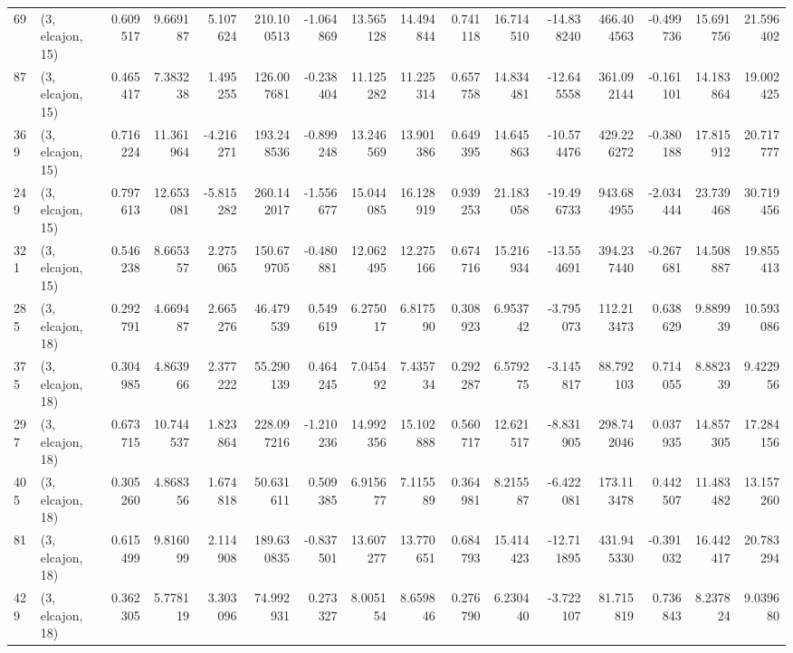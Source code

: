 \begin{tabular}{llrrrrrrrrrrrrrr}
69  &  (3, elcajon, 15) &   0.609517 &   9.669187 &   5.107624 &   210.100513 &  -1.064869 &  13.565128 &  14.494844 &  0.741118 &  16.714510 & -14.838240 &   466.404563 &  -0.499736 &  15.691756 &  21.596402 \\
87  &  (3, elcajon, 15) &   0.465417 &   7.383238 &   1.495255 &   126.007681 &  -0.238404 &  11.125282 &  11.225314 &  0.657758 &  14.834481 & -12.645558 &   361.092144 &  -0.161101 &  14.183864 &  19.002425 \\
369 &  (3, elcajon, 15) &   0.716224 &  11.361964 &  -4.216271 &   193.248536 &  -0.899248 &  13.246569 &  13.901386 &  0.649395 &  14.645863 & -10.574476 &   429.226272 &  -0.380188 &  17.815912 &  20.717777 \\
249 &  (3, elcajon, 15) &   0.797613 &  12.653081 &  -5.815282 &   260.142017 &  -1.556677 &  15.044085 &  16.128919 &  0.939253 &  21.183058 & -19.496733 &   943.684955 &  -2.034444 &  23.739468 &  30.719456 \\
321 &  (3, elcajon, 15) &   0.546238 &   8.665357 &   2.275065 &   150.679705 &  -0.480881 &  12.062495 &  12.275166 &  0.674716 &  15.216934 & -13.554691 &   394.237440 &  -0.267681 &  14.508887 &  19.855413 \\
285 &  (3, elcajon, 18) &   0.292791 &   4.669487 &   2.665276 &    46.479539 &   0.549619 &   6.275017 &   6.817590 &  0.308923 &   6.953742 &  -3.795073 &   112.213473 &   0.638629 &   9.889939 &  10.593086 \\
375 &  (3, elcajon, 18) &   0.304985 &   4.863966 &   2.377222 &    55.290139 &   0.464245 &   7.045492 &   7.435734 &  0.292287 &   6.579275 &  -3.145817 &    88.792103 &   0.714055 &   8.882339 &   9.422956 \\
297 &  (3, elcajon, 18) &   0.673715 &  10.744537 &   1.823864 &   228.097216 &  -1.210236 &  14.992356 &  15.102888 &  0.560717 &  12.621517 &  -8.831905 &   298.742046 &   0.037935 &  14.857305 &  17.284156 \\
405 &  (3, elcajon, 18) &   0.305260 &   4.868356 &   1.674818 &    50.631611 &   0.509385 &   6.915677 &   7.115589 &  0.364981 &   8.215587 &  -6.422081 &   173.113478 &   0.442507 &  11.483482 &  13.157260 \\
81  &  (3, elcajon, 18) &   0.615499 &   9.816099 &   2.114908 &   189.630835 &  -0.837501 &  13.607277 &  13.770651 &  0.684793 &  15.414423 & -12.711895 &   431.945330 &  -0.391032 &  16.442417 &  20.783294 \\
429 &  (3, elcajon, 18) &   0.362305 &   5.778119 &   3.303096 &    74.992931 &   0.273327 &   8.005154 &   8.659846 &  0.276790 &   6.230440 &  -3.722107 &    81.715819 &   0.736843 &   8.237824 &   9.039680 \\

\end{tabular}
